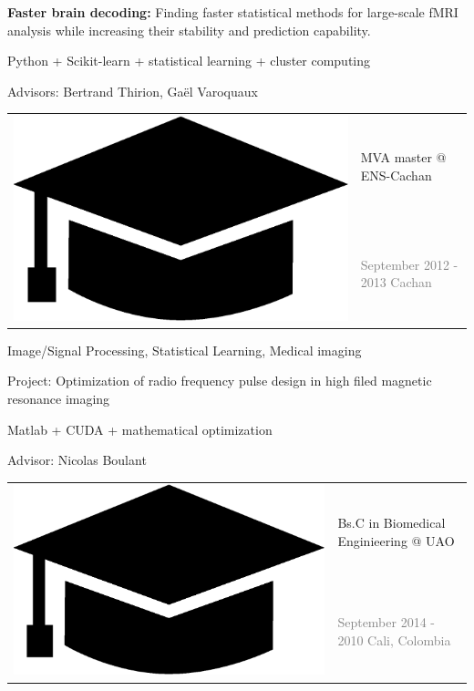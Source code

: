 \documentclass[letterpaper]{article}
\begin{document}
\begin{minipage}{1.\linewidth}
\begin{minipage}{0.47\linewidth}
\begin{minipage}{1\linewidth}
		{\small\textbf{Faster brain decoding:} Finding faster statistical 
		methods for large-scale fMRI analysis while increasing their stability 
		and prediction capability.
		
		\smallskip
		Python + Scikit-learn + statistical learning + cluster computing
		
		\smallskip
		\textmd{Advisors:} Bertrand Thirion, Ga{\"e}l Varoquaux}
	\end{minipage} %
	\begin{minipage}{1\linewidth} %
		\vspace{2ex}
		\begin{tabularx}{1\textwidth}{rX}				
			\multirow{2}{*}{\includegraphics[trim= 0.1cm 0.1cm 0.1cm 0.1cm, 
			clip=true, width=0.12\linewidth]{hat.eps}} & 
			{\large MVA master @ ENS-Cachan}\\
			& {\small\textcolor{gray}{September 2012 - 2013 \hfill Cachan}}\\
		\end{tabularx}
		\vspace{0.1cm}
		
		{\small Image/Signal Processing, Statistical Learning, Medical imaging
		
		\smallskip
		\textmd{Project:} Optimization of radio frequency pulse design in high 
		filed magnetic resonance imaging
		
		\smallskip
		Matlab + CUDA + mathematical optimization
		
		\smallskip
		\textmd{Advisor:} Nicolas Boulant}
	\end{minipage} %
	\begin{minipage}{1\linewidth} %
		\vspace{2ex}
		\begin{tabularx}{1\textwidth}{rX}				
			\multirow{2}{*}{\includegraphics[trim= 0.1cm 0.1cm 0.1cm 0.1cm,	
			clip=true, width=0.12\linewidth]{hat.eps}} & {\large Bs.C in 
			Biomedical Enginieering @ UAO}\\
			& {\small\textcolor{gray}{September 2014 - 2010 \hfill Cali, 
			Colombia}}\\
		\end{tabularx}
		\vspace{0.1cm}
		

\end{minipage}
\end{minipage}
\end{minipage}
\end{document}

